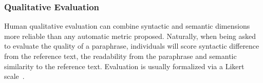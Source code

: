 


\subsubsection{Qualitative Evaluation}
\label{subsec:qualitative_evaluation}

Human qualitative evaluation can combine syntactic and semantic dimensions more reliable than any automatic metric proposed.
Naturally, when being asked to evaluate the quality of a paraphrase, individuals will score syntactic difference from the reference text, the readability from the paraphrase and semantic similarity to the reference text.
Evaluation is usually formalized via a Likert scale~\citep{gohsen_captions_2023}.

